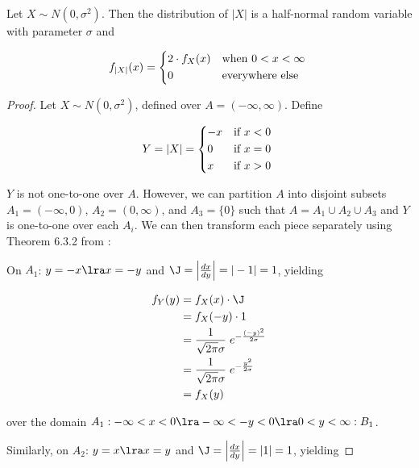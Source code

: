 \documentclass{article}
\begin{document}
\begin{helper-lem} \label{lem:p2-half-normal}
  Let $X \sim N(0, \sigma^2)$. Then the distribution of $|X|$ is a half-normal
  random variable with parameter $\sigma$ and

  \begin{equation*}
    f_{|X|}(x) =
    \begin{dcases*}
      2 \cdot f_X(x) & when $0 < x < \infty$ \\
      0 & everywhere else
    \end{dcases*}
  \end{equation*}
\end{helper-lem}

\begin{proof}
  Let $X \sim N(0, \sigma^2)$, defined over $A = (-\infty, \infty)$. Define 
  
  \begin{equation*}
    Y = |X| =
    \begin{dcases*}
      -x & if $x < 0$ \\
      0 & if $x = 0$ \\
      x & if $x > 0$ \\
    \end{dcases*}
  \end{equation*}

  $Y$ is not one-to-one over $A$. However, we can partition $A$ into disjoint
  subsets $A_1 = (-\infty, 0)$, $A_2 = (0, \infty)$, and $A_3 = \{0\}$ such
  that $A = A_1 \cup A_2 \cup A_3$ and $Y$ is one-to-one over each $A_i$. We
  can then transform each piece separately using Theorem 6.3.2 from
  \citet{textbook}:

  On $A_1$: $y = -x \lra x = -y$ and $\J = \left| \frac{dx}{dy} \right| = |-1|
  = 1$, yielding

  \begin{align}
    f_Y(y) &= f_X(x) \cdot \J \nonumber \\
    &= f_X(-y) \cdot 1 \nonumber \\
    &= \frac{1}{\sqrt{2\pi}\sigma} \; e^{-\frac{(-y)^2}{2\sigma}} \nonumber \\
    &= \frac{1}{\sqrt{2\pi}\sigma} \; e^{-\frac{y^2}{2\sigma}} \nonumber \\
    &= f_X(y) \label{eq:p2-transform-a1}
  \end{align}

  over the domain $A_1: -\infty < x < 0 \lra -\infty < -y < 0 \lra 0 < y < \infty :B_1$.

  Similarly, on $A_2$: $y = x \lra x = y$ and $\J = \left| \frac{dx}{dy}
  \right| = |1| = 1$, yielding


\end{proof}
\end{document}
